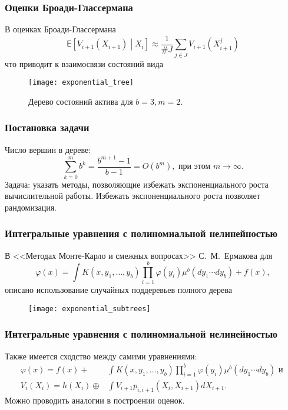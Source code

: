\documentclass[unicode, notheorems]{beamer}
\newcommand{\bluetext}[1]{{\usebeamercolor[fg]{bluetext_color}#1}}
\newcommand{\ev}{\mathsf{E}}
\newcommand{\vfi}{\varphi}
\begin{document}
\begin{frame}
    \frametitle{Оценки Броади-Глассермана} 
    В оценках Броади-Глассермана 
    $$\ev\left[ V_{i+1}\left(X_{i+1}\right)\middle\vert X_i\right] \approx \frac{1}{\# J}\sum_{j\in J} V_{i+1}\left(X^j_{i+1}\right)$$
    что приводит к взаимосвязи состояний вида
    \begin{figure}
    \centering
    \texttt{[image: exponential\_tree]}
    \caption{Дерево состояний актива для $b = 3, m = 2$.}
    \label{fig:exponential_tree}
    \end{figure}
\end{frame}

\begin{frame}
    \frametitle{Постановка задачи} 
    Число вершин в дереве:
    $$\sum_{k=0}^m b^k = \frac{b^{m+1} - 1}{b-1} = O(b^m), \text{ при этом } m\to\infty.$$
    \bluetext{Задача:} указать методы, позволяющие избежать экспоненциального роста вычислительной работы. 
    \paperheight
    Избежать экспоненциального роста позволяет рандомизация.
\end{frame}

\begin{frame}
    \frametitle{Интегральные уравнения с полиномиальной нелинейностью} 
    В <<Методах Монте-Карло и смежных вопросах>> С.~М.~Ермакова для
    $$\vfi\left(x\right) = \int K\left(x, y_1, \ldots, y_b \right)\prod_{i=1}^b\vfi\left(y_i\right) \mu^b\left(dy_1\cdots dy_b\right) + f\left(x\right),$$
    описано использование случайных поддеревьев полного дерева
    \begin{figure}
    \centering
    \texttt{[image: exponential\_subtrees]}
    \end{figure}
\end{frame}

\begin{frame}
    \frametitle{Интегральные уравнения с полиномиальной нелинейностью} 
    Также имеется сходство между самими уравнениями:
    \begin{align*}
        \vfi\left(x\right) = f\left(x\right) + &\int K\left(x, y_1, \ldots, y_b \right)\prod_{i=1}^b\vfi\left(y_i\right) \mu^b\left(dy_1\cdots dy_b\right) \text{ и } \\
        V_i(X_i) = h\left(X_i\right)\oplus &\int V_{i+1}p_{i, i+1}\left(X_i, X_{i+1}\right) dX_{i+1}.
    \end{align*}
    Можно проводить аналогии в построении оценок.
\end{frame}
\end{document}
